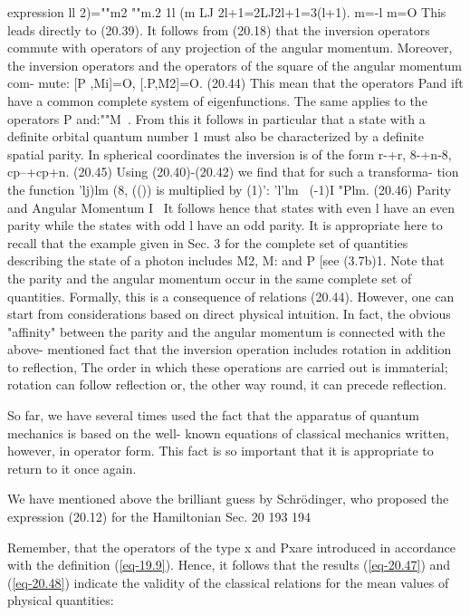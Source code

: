 \documentclass[a4paper,sfsidenotes,colorlinks=true]{tufte-book}
\numberwithin{equation}{section}
\numberwithin{figure}{section}
\begin{document}
{{    expression ll 2)=""m2 ""m.2 1l (m LJ 2l+1=2LJ2l+1=3(l+1).  m=-l
    m=O This leads directly to (20.39).  It follows from (20.18) that
    the inversion operators commute with operators of any projection
    of the angular momentum. Moreover, the inversion operators and the
    operators of the square of the angular momentum com- mute: [P
    ,Mi]=O, [.P,M2]=O. (20.44) This mean that the operators Pand ift
    have a common complete system of eigenfunctions. The same applies
    to the operators P and:""M~. From this it follows in particular
    that a state with a definite orbital quantum number 1 must also be
    characterized by a definite spatial parity. In spherical
    coordinates the inversion is of the form r-+r, 8-+n-8,
    cp--+cp+n. (20.45) Using (20.40)-(20.42) we find that for such a
    transforma- tion the function 'lj)lm (8, (()) is multiplied by
    (1)': 'l'lm~ (-1)I "Plm. (20.46) Parity and Angular Momentum I~ It
    follows hence that states with even l have an even parity while
    the states with odd l have an odd parity. It is appropriate here
    to recall that the example given in Sec. 3 for the complete set of
    quantities describing the state of a photon includes M2, M: and P
    [see (3.7b)1. Note that the parity and the angular momentum occur
    in the same complete set of quantities. Formally, this is a
    consequence of relations (20.44). However, one can start from
    considerations based on direct physical intuition. In fact, the
    obvious "affinity" between the parity and the angular momentum is
    connected with the above- mentioned fact that the inversion
    operation includes rotation in addition to reflection, The order
    in which these operations are carried out is immaterial; rotation
    can follow reflection or, the other way round, it can precede
    reflection. 

So  far, we have several times used the fact that the
    apparatus of quantum mechanics is based on the well- known
    equations of classical mechanics written, however, in operator
    form. This fact is so important that it is appropriate to return
    to it once again.  

We have mentioned above the brilliant guess by
    Schr\"odinger, who proposed the expression (20.12) for the
    Hamiltonian Sec. 20  193 194 

Remember, that the operators of the type x and Pxare
    introduced in accordance with the definition (\ref{eq-19.9}). Hence, it
    follows that the results (\ref{eq-20.47}) and (\ref{eq-20.48}) indicate the validity
    of the classical relations for the mean values of physical
    quantities: 

}}
\end{document}

